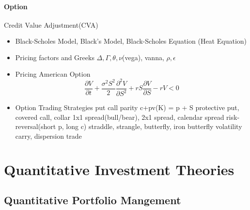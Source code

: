 \documentclass[11pt, openany]{book}              %
\begin{document}
\subsection{Option}

Credit Value Adjustment(CVA)
 \begin{itemize}
    \item Black-Scholes Model, Black's Model, Black-Scholes Equation (Heat Equation)
    \item Pricing factors and Greeks $\Delta,\Gamma, \theta, \nu$(vega), vanna, $\rho,\epsilon$ 
    \item Pricing American Option
    $$\frac{\partial V}{\partial t} + \frac{\sigma^2 S^2}{2} \frac{\partial^2 V}{\partial S^2}+ r S \frac{\partial V}{\partial S} - rV < 0 $$
    \item Option Trading Strategies
     \subitem put call parity c+pv(K) = p + S
     \subitem protective put, covered call, collar
     \subitem 1x1 spread(bull/bear), 2x1 spread, calendar spread
     \subitem risk-reversal(short p, long c)
     \subitem straddle, strangle, butterfly, iron butterfly
     \subitem volatility carry, dispersion trade
\end{itemize}



\part{Quantitative Investment Theories}
\chapter{Quantitative Portfolio Mangement}
\end{document}
